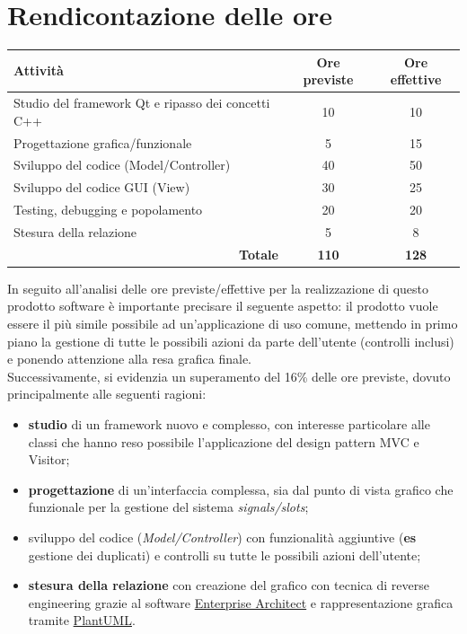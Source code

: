 \documentclass[a4paper,10pt]{article}
\begin{document}
	\section{Rendicontazione delle ore}
	\begin{table}[h!]
		\centering
		\begin{tabular}{lcc}
			\toprule
			Attività & Ore previste & Ore effettive \\
			\midrule
			Studio del framework Qt e ripasso dei concetti C++ & 10 & 10 \\
			Progettazione grafica/funzionale & 5 & 15 \\
			Sviluppo del codice (Model/Controller) & 40 & 50 \\
			Sviluppo del codice GUI (View) & 30 & 25 \\
			Testing, debugging e popolamento & 20 & 20 \\
			Stesura della relazione & 5 & 8 \\
			\bottomrule
			\multicolumn{1}{r}{\textbf{Totale}} & \textbf{110} & \textbf{128} \\
		\end{tabular}
	\end{table}
	In seguito all'analisi delle ore previste/effettive per la realizzazione di questo prodotto software è importante precisare il seguente aspetto: il prodotto vuole essere il più simile possibile ad un'applicazione di uso comune, mettendo in primo piano la gestione di tutte le possibili azioni da parte dell'utente (controlli inclusi) e ponendo attenzione alla resa grafica finale.\\
	Successivamente, si evidenzia un superamento del 16\% delle ore previste, dovuto principalmente alle seguenti ragioni:
	\begin{itemize}
		\item \textbf{studio} di un framework nuovo e complesso, con interesse particolare alle classi che hanno reso possibile l'applicazione del design pattern MVC e Visitor;
		\item \textbf{progettazione} di un'interfaccia complessa, sia dal punto di vista grafico che funzionale per la gestione del sistema \textit{signals/slots};
		\item sviluppo del codice (\textit{Model/Controller}) con funzionalità aggiuntive (\textbf{es} gestione dei duplicati) e controlli su tutte le possibili azioni dell'utente;
		\item \textbf{stesura della relazione} con creazione del grafico con tecnica di reverse engineering grazie al software \href{https://sparxsystems.com/products/ea/}{Enterprise Architect} e rappresentazione grafica tramite \href{https://plantuml.com/}{PlantUML}.
	\end{itemize}
	
\end{document}
